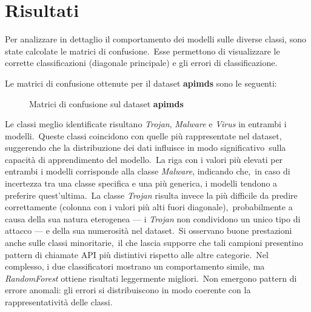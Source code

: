 \newcommand{\mtrdescription}[1]{Matrici di confusione sul dataset \textbf{#1}}
\newcommand{\clsdescription}[1]{F1-score, Recall, Precision sul dataset \textbf{#1}}
\newcommand{\grpdescription}[1]{Global accuracy, micro e macro metriche sul dataset \textbf{#1}}

\section{Risultati}

Per analizzare in dettaglio il comportamento dei modelli sulle diverse classi, sono state calcolate le matrici di confusione.\
Esse permettono di visualizzare le corrette classificazioni (diagonale principale) e gli errori di classificazione.




Le matrici di confusione ottenute per il dataset \textbf{apimds} sono le seguenti:

\begin{figure}[ht]
    \centering
    \caption{\mtrdescription{apimds}}
    \label{fig:apimds-mtrx-rf}
\end{figure}

Le classi meglio identificate risultano \textit{Trojan}, \textit{Malware} e \textit{Virus} in entrambi i modelli.\
Queste classi coincidono con quelle più rappresentate nel dataset, suggerendo che la distribuzione dei dati influisce in modo significativo\
sulla capacità di apprendimento del modello.\
La riga con i valori più elevati per entrambi i modelli corrisponde alla classe \textit{Malware}, indicando che,\
in caso di incertezza tra una classe specifica e una più generica, i modelli tendono a preferire quest'ultima.\
La classe \textit{Trojan} risulta invece la più difficile da predire correttamente (colonna con i valori più alti fuori diagonale),\
probabilmente a causa della sua natura eterogenea — i \textit{Trojan} non condividono un unico tipo di attacco — e della sua numerosità nel dataset.\
Si osservano buone prestazioni anche sulle classi minoritarie,\
il che lascia supporre che tali campioni presentino pattern di chiamate API più distintivi rispetto alle altre categorie.\
Nel complesso, i due classificatori mostrano un comportamento simile, ma \textit{RandomForest} ottiene risultati leggermente migliori.\
Non emergono pattern di errore anomali: gli errori si distribuiscono in modo coerente con la rappresentatività delle classi.

